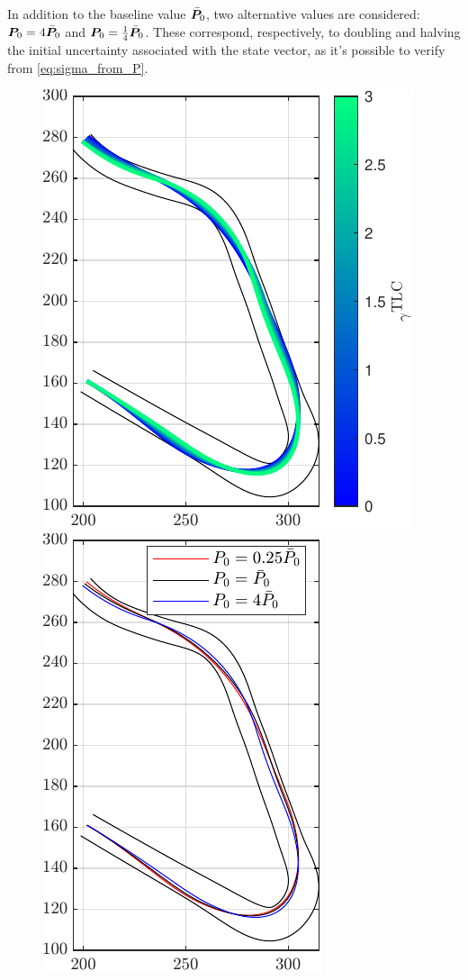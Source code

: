 In addition to the baseline value $\bar{\boldsymbol{P}}_0$, two alternative values are considered: $\boldsymbol{P}_0 = 4\bar{\boldsymbol{P}}_0$ and $\boldsymbol{P}_0 = \frac{1}{4}\bar{\boldsymbol{P}}_0$. These correspond, respectively, to doubling and halving the initial uncertainty associated with the state vector, as it's possible to verify from \eqref{eq:sigma_from_P}. 

\begin{figure}
	\centering
	\includegraphics{Fig/gamma_sensitivity.pdf}
	\hfill
	\includegraphics{Fig/Pzero_sensitivity.pdf}

\end{figure}
